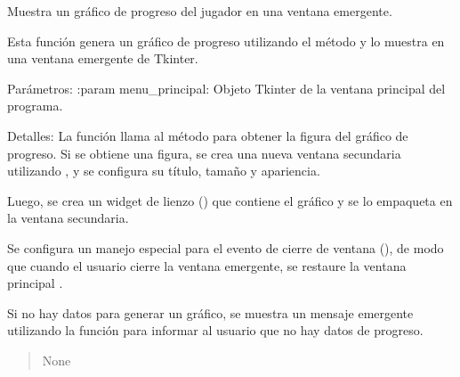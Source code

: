 \documentclass[letterpaper,10pt,spanish]{sphinxmanual}
\begin{document}
\begin{fulllineitems}
\begin{fulllineitems}
\begin{quote}
\begin{description}
\end{description}\end{quote}

\end{fulllineitems}


\begin{fulllineitems}
\label{\detokenize{datos:datos.GestionDatos.mostrar_grafico_tkinter}}
\pysigstartsignatures
{}
\pysigstopsignatures
\sphinxAtStartPar
Muestra un gráfico de progreso del jugador en una ventana emergente.

\sphinxAtStartPar
Esta función genera un gráfico de progreso utilizando el método 
y lo muestra en una ventana emergente de Tkinter.

\sphinxAtStartPar
Parámetros:
:param menu\_principal: Objeto Tkinter de la ventana principal del programa.

\sphinxAtStartPar
Detalles:
La función llama al método  para obtener la figura del gráfico de progreso.
Si se obtiene una figura, se crea una nueva ventana secundaria utilizando ,
y se configura su título, tamaño y apariencia.

\sphinxAtStartPar
Luego, se crea un widget de lienzo () que contiene el gráfico y se lo
empaqueta en la ventana secundaria.

\sphinxAtStartPar
Se configura un manejo especial para el evento de cierre de ventana (),
de modo que cuando el usuario cierre la ventana emergente, se restaure la ventana
principal .

\sphinxAtStartPar
Si no hay datos para generar un gráfico, se muestra un mensaje emergente utilizando la
función  para informar al usuario que no hay datos de progreso.
\begin{quote}\begin{description}
\sphinxAtStartPar
None

\end{description}\end{quote}

\end{fulllineitems}


\end{fulllineitems}
\end{document}
